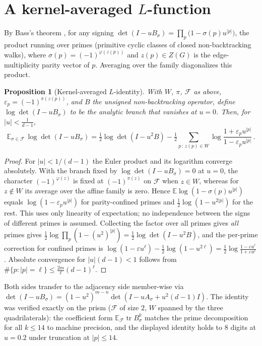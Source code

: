 \documentclass[11pt]{article}
\newtheorem{proposition}[lemma]{Proposition}
\theoremstyle{remark}
\DeclareMathOperator{\tr}{tr}
\begin{document}
\section{\texorpdfstring{A kernel-averaged $L$-function}{A kernel-averaged L-function}}\label{sec:zeta}

By Bass's theorem \cite{bass92}, for any signing
$\det(I-uB_\sigma)=\prod_{p}\big(1-\sigma(p)u^{|p|}\big)$, the product
running over primes (primitive cyclic classes of closed non-backtracking
walks), where $\sigma(p)=(-1)^{\varphi(z(p))}$ and $z(p)\in Z(G)$ is the
edge-multiplicity parity vector of $p$. Averaging over the family
diagonalizes this product.

\begin{proposition}[Kernel-averaged $L$-identity]\label{prop:Lident}
With $W$, $\pi$, $\mathcal F$ as above, $\varepsilon_p=(-1)^{\pi(z(p))}$,
and $B$ the \emph{unsigned} non-backtracking operator, define
$\log\det(I-uB_\sigma)$ to be the analytic branch that vanishes at $u=0$.
Then, for $|u|<\tfrac1{d-1}$,
\[
\mathbb E_{\sigma\in\mathcal F}\,\log\det(I-uB_\sigma)
=\tfrac12\log\det(I-u^2B)
-\tfrac12\!\!\sum_{p\,:\,z(p)\in W}\!\!
\log\frac{1+\varepsilon_pu^{|p|}}{1-\varepsilon_pu^{|p|}}\,.
\]
\end{proposition}

\begin{proof}
For $|u|<1/(d-1)$ the Euler product and its logarithm converge
absolutely. With the branch fixed by $\log\det(I-uB_\sigma)=0$ at $u=0$,
the character $(-1)^{\varphi(z)}$ is fixed at $(-1)^{\pi(z)}$ on $\mathcal F$ when
$z\in W$, whereas for $z\notin W$ its average over the affine family is zero. Hence
$\mathbb E\log(1-\sigma(p)u^{|p|})$ equals
$\log(1-\varepsilon_pu^{|p|})$ for parity-confined primes and
$\tfrac12\log(1-u^{2|p|})$ for the rest. This uses only linearity of expectation;
no independence between the signs of different primes is assumed. Collecting the
factor over all primes gives
\emph{all} primes gives
$\tfrac12\log\prod_p(1-(u^2)^{|p|})=\tfrac12\log\det(I-u^2B)$, and the
per-prime correction for confined primes is
$\log(1-\varepsilon u^{\ell})-\tfrac12\log(1-u^{2\ell})
=\tfrac12\log\frac{1-\varepsilon u^{\ell}}{1+\varepsilon u^{\ell}}$.
Absolute convergence for $|u|(d-1)<1$ follows from
$\#\{p:|p|=\ell\}\le\tfrac{2m}{\ell}(d-1)^{\ell}$.
\end{proof}

Both sides transfer to the adjacency side member-wise via
$\det(I-uB_\sigma)=(1-u^2)^{m-n}\det(I-uA_\sigma+u^2(d-1)I)$. The
identity was verified exactly on the prism ($\mathcal F$ of size $2$,
$W$ spanned by the three quadrilaterals): the coefficient form
$\mathbb E_{\mathcal F}\tr B_\sigma^k$ matches the prime decomposition
for all $k\le14$ to machine precision, and the displayed identity holds
to $8$ digits at $u=0.2$ under truncation at $|p|\le14$.
\end{document}

